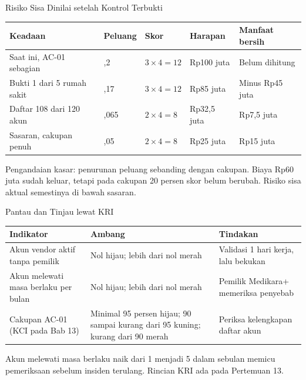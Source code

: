 \documentclass[aspectratio=169, table, 12pt]{beamer}
\begin{document}
\begin{frame}{{\Large Risiko Sisa Dinilai setelah Kontrol Terbukti}}
  \vspace{2pt}
  \footnotesize
  \begin{tabularx}{\textwidth}{|>{\raggedright\arraybackslash}X|>{\raggedright\arraybackslash}p{}|>{\raggedright\arraybackslash}p{}|>{\raggedright\arraybackslash}p{}|>{\raggedright\arraybackslash}p{}|}
    \hline
    \textbf{Keadaan} & \textbf{Peluang} & \textbf{Skor} & \textbf{Harapan} & \textbf{Manfaat bersih} \\
    \hline
    Saat ini, AC-01 sebagian & 0,2 & $3 \times 4 = 12$ & Rp100 juta & Belum dihitung \\ \hline
    Bukti 1 dari 5 rumah sakit & 0,17 & $3 \times 4 = 12$ & Rp85 juta & Minus Rp45 juta \\ \hline
    Daftar 108 dari 120 akun & 0,065 & $2 \times 4 = 8$ & Rp32,5 juta & Rp7,5 juta \\ \hline
    Sasaran, cakupan penuh & 0,05 & $2 \times 4 = 8$ & Rp25 juta & Rp15 juta \\ \hline
  \end{tabularx}

  \vspace{6pt}
  \small Pengandaian kasar: penurunan peluang sebanding dengan cakupan. Biaya Rp60 juta sudah keluar,
  tetapi pada cakupan 20 persen skor belum berubah. Risiko sisa aktual semestinya di bawah sasaran.
\end{frame}

\begin{frame}{{\Large Pantau dan Tinjau lewat KRI}}
  \vspace{2pt}
  \footnotesize
  \begin{tabularx}{\textwidth}{|>{\raggedright\arraybackslash}X|>{\raggedright\arraybackslash}p{}|>{\raggedright\arraybackslash}X|}
    \hline
    \textbf{Indikator} & \textbf{Ambang} & \textbf{Tindakan} \\ \hline
    Akun vendor aktif tanpa pemilik & Nol hijau; lebih dari nol merah & Validasi 1 hari kerja, lalu
    bekukan \\ \hline
    Akun melewati masa berlaku per bulan & Nol hijau; lebih dari nol merah & Pemilik Medikara+ memeriksa
    penyebab \\ \hline
    Cakupan AC-01 (KCI pada Bab 13) & Minimal 95 persen hijau; 90 sampai kurang dari 95 kuning; kurang
    dari 90 merah & Periksa kelengkapan daftar akun \\ \hline
  \end{tabularx}

  \vspace{6pt}
  \small Akun melewati masa berlaku naik dari 1 menjadi 5 dalam sebulan memicu pemeriksaan sebelum
  insiden terulang. Rincian KRI ada pada Pertemuan 13.
\end{frame}
\end{document}
